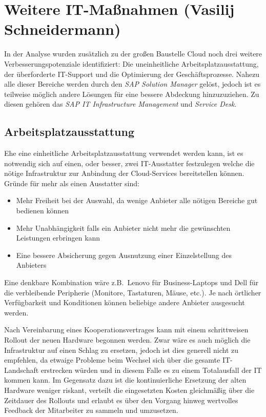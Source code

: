 \section{Weitere IT-Maßnahmen (Vasilij Schneidermann)}

In der Analyse wurden zusätzlich zu der großen Baustelle Cloud noch
drei weitere Verbesserungspotenziale identifiziert: Die uneinheitliche
Arbeitsplatzausstattung, der überforderte IT-Support und die
Optimierung der Geschäftsprozesse.  Nahezu alle dieser Bereiche werden
durch den \emph{SAP Solution Manager} gelöst, jedoch ist es teilweise
möglich andere Lösungen für eine bessere Abdeckung hinzuzuziehen.  Zu
diesen gehören das \emph{SAP IT Infrastructure Management} und
\emph{Service Desk}.

\subsection{Arbeitsplatzausstattung}

Ehe eine einheitliche Arbeitsplatzausstattung verwendet werden kann,
ist es notwendig sich auf einen, oder besser, zwei IT-Ausstatter
festzulegen welche die nötige Infrastruktur zur Anbindung der
Cloud-Services bereitstellen können.  Gründe für mehr als einen
Ausstatter sind:

\begin{itemize}
\item Mehr Freiheit bei der Auswahl, da wenige Anbieter alle nötigen
  Bereiche gut bedienen können
\item Mehr Unabhängigkeit falls ein Anbieter nicht mehr die
  gewünschten Leistungen erbringen kann
\item Eine bessere Absicherung gegen Ausnutzung einer Einzelstellung
  des Anbieters
\end{itemize}

Eine denkbare Kombination wäre z.B.~Lenovo für Business-Laptops und
Dell für die verbleibende Peripherie (Monitore, Tastaturen, Mäuse,
etc.).  Je nach örtlicher Verfügbarkeit und Konditionen können
beliebige andere Anbieter ausgesucht werden.

Nach Vereinbarung eines Kooperationsvertrages kann mit einem
schrittweisen Rollout der neuen Hardware begonnen werden.  Zwar wäre
es auch möglich die Infrastruktur auf einen Schlag zu ersetzen, jedoch
ist dies generell nicht zu empfehlen, da etwaige Probleme beim Wechsel
sich über die gesamte IT-Landschaft erstrecken würden und in diesem
Falle es zu einem Totalausfall der IT kommen kann.  Im Gegensatz dazu
ist die kontinuierliche Ersetzung der alten Hardware weniger riskant,
verteilt die eingesetzten Kosten gleichmäßig über die Zeitdauer des
Rollouts und erlaubt es über den Vorgang hinweg wertvolles Feedback
der Mitarbeiter zu sammeln und umzusetzen.


